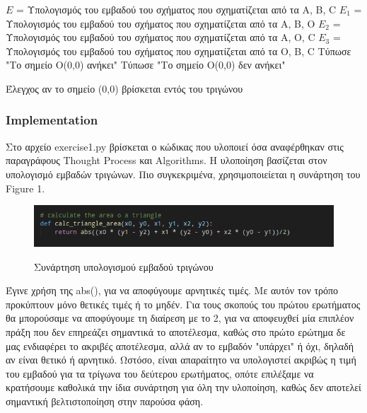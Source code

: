 \documentclass[12pt]{article}
\newenvironment{matlab}
	{\begin{figure}[hp]\centering\captionsetup{justification=centering}}
	{\end{figure}}
\begin{document}
\begin{algorithm}[H]
	\SetAlgoLined
	
	\(E\) = Υπολογισμός του εμβαδού του σχήματος που σχηματίζεται από τα A, B, C \;
	\(E_1\) = Υπολογισμός του εμβαδού του σχήματος που σχηματίζεται από τα A, B, O \;
	\(E_2\) = Υπολογισμός του εμβαδού του σχήματος που σχηματίζεται από τα A, O, C \;
	\(E_3\) = Υπολογισμός του εμβαδού του σχήματος που σχηματίζεται από τα O, B, C \;
	{Τύπωσε "Το σημείο O(0,0) ανήκει" \;}
	{Τύπωσε "Το σημείο O(0,0) δεν ανήκει" \;}
	
	\caption{Έλεγχος αν το σημείο (0,0) βρίσκεται εντός του τριγώνου}
\end{algorithm}

\subsubsection*{Implementation}

Στο αρχείο exercise1.py βρίσκεται ο κώδικας που υλοποιεί όσα αναφέρθηκαν στις παραγράφους Thought Process και Algorithms. Η υλοποίηση βασίζεται στον υπολογισμό εμβαδών τριγώνων. Πιο συγκεκριμένα, χρησιμοποιείεται η συνάρτηση του Figure 1. \\

\begin{matlab}
	\includegraphics[scale=0.6]{images/exercise1_impl.png}
  	\caption{Συνάρτηση υπολογισμού εμβαδού τριγώνου}
\end{matlab} 

Έγινε χρήση της abs(), για να αποφύγουμε αρνητικές τιμές. Με αυτόν τον τρόπο προκύπτουν μόνο θετικές τιμές ή το μηδέν. Για τους σκοπούς του πρώτου ερωτήματος θα μπορούσαμε να αποφύγουμε τη διαίρεση με το 2, για να αποφευχθεί μία επιπλέον πράξη που δεν επηρεάζει σημαντικά το αποτέλεσμα, καθώς στο πρώτο ερώτημα δε μας ενδιαφέρει το ακριβές αποτέλεσμα, αλλά αν το εμβαδόν "υπάρχει" ή όχι, δηλαδή αν είναι θετικό ή αρνητικό. Ωστόσο, είναι απαραίτητο να υπολογιστεί ακριβώς η τιμή του εμβαδού για τα τρίγωνα του δεύτερου ερωτήματος, οπότε επιλέξαμε να κρατήσουμε καθολικά την ίδια συνάρτηση για όλη την υλοποίηση, καθώς δεν αποτελεί σημαντική βελτιστοποίηση στην παρούσα φάση. \\
\end{document}
